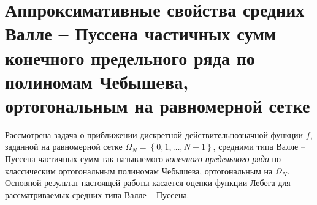 \chapter{Аппроксимативные свойства средних Валле -- Пуссена частичных сумм
конечного предельного ряда по полиномам Чебышeва, ортогональным на равномерной сетке}


Рассмотрена задача о приближении дискретной действительнозначной функции $f$, заданной на равномерной сетке $\Omega_N = \left\{ 0, 1, \ldots, N-1 \right\}$, средними типа Валле -- Пуссена частичных сумм так называемого \textit{конечного предельного ряда} по классическим ортогональным полиномам Чебышева, ортогональным на $\Omega_N$. Основной результат настоящей работы касается оценки функции Лебега для рассматриваемых средних типа Валле -- Пуссена. 

